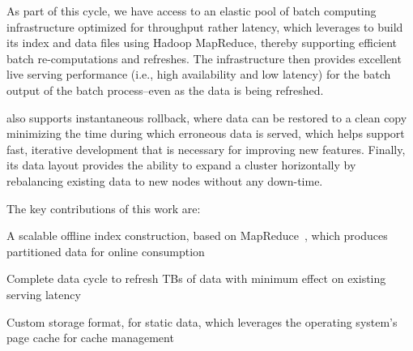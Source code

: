 As part of this cycle, we have access to an elastic pool of batch
computing infrastructure optimized for throughput rather latency, which
\projectname{} leverages to build its index and data files using Hadoop MapReduce,
thereby supporting efficient batch re-computations and refreshes. The \projectname{} 
infrastructure then provides excellent live serving performance (i.e., high
availability and low latency) for the batch output of the batch process--even 
as the data is being refreshed.

\longpage
\projectname{} also supports instantaneous rollback, where data can be
restored to a clean copy minimizing the time during which erroneous data is served, 
which helps support fast, iterative development that is necessary for improving new
features. Finally, its data layout provides the ability to expand a cluster
horizontally by rebalancing existing data to new nodes without any down-time. 

The key contributions of this work are:
\begin{compactitem}
\item A scalable offline index construction, based on 
MapReduce~\cite{dean}, which produces partitioned data for online consumption
\item Complete data cycle to refresh TBs of data with minimum effect on
existing serving latency
\item Custom storage format, for static data, which leverages the 
operating system's page cache for cache management
\end{compactitem}

